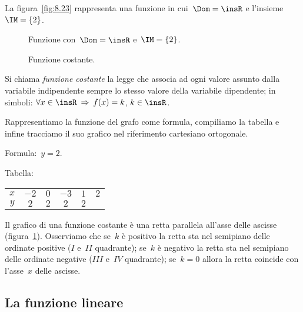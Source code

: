 La figura~\ref{fig:8.23} rappresenta una funzione in cui~$\Dom=\insR$ e l'insieme~$\IM=\{2\}$.

\begin{figure}[h]
 \begin{minipage}[b]{.50\textwidth}
  \centering
  \caption{Funzione con~$\Dom=\insR$ e~$\IM=\{2\}$.}\label{fig:8.23}
 \end{minipage}\hfil
 \begin{minipage}[b]{.4\textwidth}
  \centering
  \caption{Funzione costante.}\label{fig:8.24}
 \end{minipage}
\end{figure}

\begin{definizione}
Si chiama \emph{funzione costante} la legge che associa ad ogni valore assunto dalla variabile indipendente sempre lo stesso valore
della variabile dipendente; in simboli: $\forall x\in \insR \:\Rightarrow\: f(x)=k$, $k\in \insR$.
\end{definizione}

Rappresentiamo la funzione del grafo come formula, compiliamo la tabella e infine tracciamo il suo grafico
nel riferimento cartesiano ortogonale.

Formula:~$y=2$.

Tabella:
\begin{center}
 \begin{tabular}{cccccc}
 \toprule
 $x$ & $-2$ & $0$ & $-3$ & $1$ & $2$ \\
 $y$ & $2$ & $2$ & $2$ & $2$ &  \\
 \bottomrule
 \end{tabular}
\end{center}

Il grafico di una funzione costante è una retta parallela all'asse delle ascisse (figura~\ref{fig:8.24}).
Osserviamo che se~$k$ è positivo la retta sta nel semipiano delle ordinate positive ($I$ e~$II$ quadrante);
se~$k$ è negativo la retta sta nel semipiano delle ordinate negative ($III$ e~$IV$ quadrante);
se~$k=0$ allora la retta coincide con l'asse~$x$ delle ascisse.

\vspazio\ovalbox{\risolvii \ref{ese:8.46}, \ref{ese:8.47}, \ref{ese:8.48}, \ref{ese:8.49}}
\pagebreak
\subsection{La funzione lineare}

